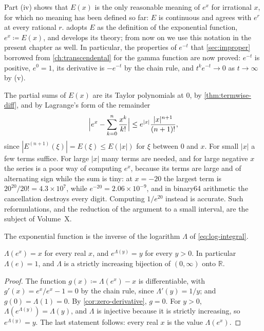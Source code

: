 Part (iv) shows that $E(x)$ is the only reasonable meaning of $e^x$ for irrational $x$, for which no meaning has been defined so far: $E$ is continuous and agrees with $e^r$ at every rational $r$.  adopts $E$ as the definition of the exponential function, $e^x\coloneqq E(x)$, and develops its theory; from now on we use this notation in the present chapter as well. In particular, the properties of $e^{-t}$ that \cref{sec:improper} borrowed from \cref{ch:transcendental} for the gamma function are now proved: $e^{-t}$ is positive, $e^0=1$, its derivative is $-e^{-t}$ by the chain rule, and $t^ke^{-t}\to0$ as $t\to\infty$ by (v).

The partial sums of $E(x)$ are its Taylor polynomials at $0$, by \cref{thm:termwise-diff}, and by Lagrange's form of the remainder
\begin{equation}
\Bigl|e^x-\sum_{k=0}^n\frac{x^k}{k!}\Bigr|\le e^{|x|}\frac{|x|^{n+1}}{(n+1)!},
\label{eq:exp-remainder}
\end{equation}
since $|E^{(n+1)}(\xi)|=E(\xi)\le E(|x|)$ for $\xi$ between $0$ and $x$. For small $|x|$ a few terms suffice. For large $|x|$ many terms are needed, and for large negative $x$ the series is a poor way of computing $e^x$, because its terms are large and of alternating sign while the sum is tiny: at $x=-20$ the largest term is $20^{20}/20!=4.3\times10^7$, while $e^{-20}=2.06\times10^{-9}$, and in binary64 arithmetic the cancellation destroys every digit. Computing $1/e^{20}$ instead is accurate. Such reformulations, and the reduction of the argument to a small interval, are the subject of Volume~X.

The exponential function is the inverse of the logarithm $\Lambda$ of \eqref{eq:log-integral}.

\begin{proposition}
\label{prop:log-exp}
$\Lambda(e^x)=x$ for every real $x$, and $e^{\Lambda(y)}=y$ for every $y>0$. In particular $\Lambda(e)=1$, and $\Lambda$ is a strictly increasing bijection of $(0,\infty)$ onto $\mathbb R$.
\end{proposition}

\begin{proof}
The function $g(x)\coloneqq\Lambda(e^x)-x$ is differentiable, with $g'(x)=e^x/e^x-1=0$ by the chain rule, since $\Lambda'(y)=1/y$; and $g(0)=\Lambda(1)=0$. By \cref{cor:zero-derivative}, $g=0$. For $y>0$, $\Lambda(e^{\Lambda(y)})=\Lambda(y)$, and $\Lambda$ is injective because it is strictly increasing, so $e^{\Lambda(y)}=y$. The last statement follows: every real $x$ is the value $\Lambda(e^x)$.
\end{proof}


